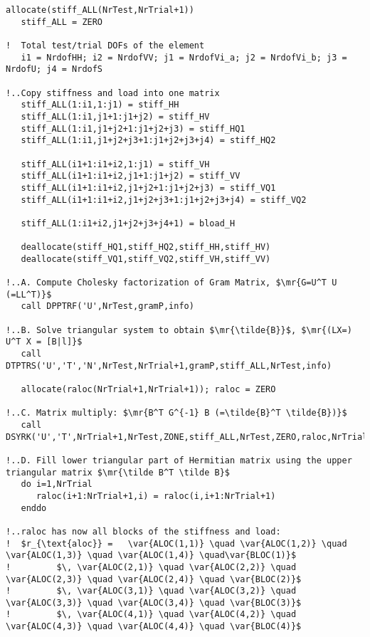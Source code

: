 \begin{lstlisting}[mathescape,caption=\file{POISSON/ULTRAWEAK\_DPG/}\routine{elem}: constructing DPG linear system.]
   allocate(stiff_ALL(NrTest,NrTrial+1))
   stiff_ALL = ZERO

!  Total test/trial DOFs of the element
   i1 = NrdofHH; i2 = NrdofVV; j1 = NrdofVi_a; j2 = NrdofVi_b; j3 = NrdofU; j4 = NrdofS

!..Copy stiffness and load into one matrix
   stiff_ALL(1:i1,1:j1) = stiff_HH
   stiff_ALL(1:i1,j1+1:j1+j2) = stiff_HV
   stiff_ALL(1:i1,j1+j2+1:j1+j2+j3) = stiff_HQ1
   stiff_ALL(1:i1,j1+j2+j3+1:j1+j2+j3+j4) = stiff_HQ2

   stiff_ALL(i1+1:i1+i2,1:j1) = stiff_VH
   stiff_ALL(i1+1:i1+i2,j1+1:j1+j2) = stiff_VV
   stiff_ALL(i1+1:i1+i2,j1+j2+1:j1+j2+j3) = stiff_VQ1
   stiff_ALL(i1+1:i1+i2,j1+j2+j3+1:j1+j2+j3+j4) = stiff_VQ2

   stiff_ALL(1:i1+i2,j1+j2+j3+j4+1) = bload_H

   deallocate(stiff_HQ1,stiff_HQ2,stiff_HH,stiff_HV)
   deallocate(stiff_VQ1,stiff_VQ2,stiff_VH,stiff_VV)

!..A. Compute Cholesky factorization of Gram Matrix, $\mr{G=U^T U (=LL^T)}$
   call DPPTRF('U',NrTest,gramP,info)

!..B. Solve triangular system to obtain $\mr{\tilde{B}}$, $\mr{(LX=) U^T X = [B|l]}$
   call DTPTRS('U','T','N',NrTest,NrTrial+1,gramP,stiff_ALL,NrTest,info)

   allocate(raloc(NrTrial+1,NrTrial+1)); raloc = ZERO

!..C. Matrix multiply: $\mr{B^T G^{-1} B (=\tilde{B}^T \tilde{B})}$
   call DSYRK('U','T',NrTrial+1,NrTest,ZONE,stiff_ALL,NrTest,ZERO,raloc,NrTrial+1)

!..D. Fill lower triangular part of Hermitian matrix using the upper triangular matrix $\mr{\tilde B^T \tilde B}$
   do i=1,NrTrial
      raloc(i+1:NrTrial+1,i) = raloc(i,i+1:NrTrial+1)
   enddo
   
!..raloc has now all blocks of the stiffness and load:
!  $r_{\text{aloc}} =   \var{ALOC(1,1)} \quad \var{ALOC(1,2)} \quad \var{ALOC(1,3)} \quad \var{ALOC(1,4)} \quad\var{BLOC(1)}$
!         $\, \var{ALOC(2,1)} \quad \var{ALOC(2,2)} \quad \var{ALOC(2,3)} \quad \var{ALOC(2,4)} \quad \var{BLOC(2)}$
!         $\, \var{ALOC(3,1)} \quad \var{ALOC(3,2)} \quad \var{ALOC(3,3)} \quad \var{ALOC(3,4)} \quad \var{BLOC(3)}$
!         $\, \var{ALOC(4,1)} \quad \var{ALOC(4,2)} \quad \var{ALOC(4,3)} \quad \var{ALOC(4,4)} \quad \var{BLOC(4)}$
\end{lstlisting}
